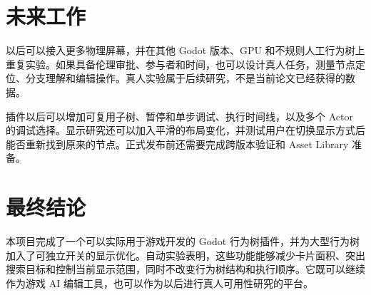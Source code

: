 \section{未来工作}

以后可以接入更多物理屏幕，并在其他 Godot 版本、GPU 和不规则人工行为树上重复实验。如果具备伦理审批、参与者和时间，也可以设计真人任务，测量节点定位、分支理解和编辑操作。真人实验属于后续研究，不是当前论文已经获得的数据。

插件以后可以增加可复用子树、暂停和单步调试、执行时间线，以及多个 Actor 的调试选择。显示研究还可以加入平滑的布局变化，并测试用户在切换显示方式后能否重新找到原来的节点。正式发布前还需要完成跨版本验证和 Asset Library 准备。

\section{最终结论}

本项目完成了一个可以实际用于游戏开发的 Godot 行为树插件，并为大型行为树加入了可独立开关的显示优化。自动实验表明，这些功能能够减少卡片面积、突出搜索目标和控制当前显示范围，同时不改变行为树结构和执行顺序。它既可以继续作为游戏 AI 编辑工具，也可以作为以后进行真人可用性研究的平台。
